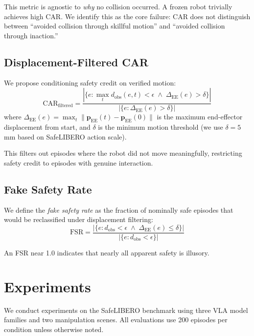 \documentclass[letterpaper]{article}
\begin{document}
This metric is agnostic to \emph{why} no collision occurred. A frozen robot trivially achieves high CAR. We identify this as the core failure: CAR does not distinguish between ``avoided collision through skillful motion'' and ``avoided collision through inaction.''

\subsection{Displacement-Filtered CAR}

We propose conditioning safety credit on verified motion:
\begin{equation}
    \text{CAR}_{\text{filtered}} = \frac{|\{e : \max_t d_{\text{obs}}(e,t) < \epsilon \;\wedge\; \Delta_{\text{EE}}(e) > \delta\}|}{|\{e : \Delta_{\text{EE}}(e) > \delta\}|}
\end{equation}
where $\Delta_{\text{EE}}(e) = \max_t \|\mathbf{p}_{\text{EE}}(t) - \mathbf{p}_{\text{EE}}(0)\|$ is the maximum end-effector displacement from start, and $\delta$ is the minimum motion threshold (we use $\delta = 5$\,mm based on SafeLIBERO action scale).

This filters out episodes where the robot did not move meaningfully, restricting safety credit to episodes with genuine interaction.

\subsection{Fake Safety Rate}

We define the \emph{fake safety rate} as the fraction of nominally safe episodes that would be reclassified under displacement filtering:
\begin{equation}
    \text{FSR} = \frac{|\{e : d_{\text{obs}} < \epsilon \;\wedge\; \Delta_{\text{EE}}(e) \leq \delta\}|}{|\{e : d_{\text{obs}} < \epsilon\}|}
\end{equation}

An FSR near 1.0 indicates that nearly all apparent safety is illusory.

\section{Experiments}
\label{sec:experiments}

We conduct experiments on the SafeLIBERO benchmark using three VLA model families and two manipulation scenes. All evaluations use 200 episodes per condition unless otherwise noted.
\end{document}
